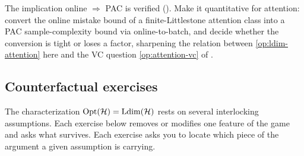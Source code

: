 \begin{openprob}
\label{op:online-to-batch-attention}
The implication online $\Rightarrow$ PAC is verified ().  Make it quantitative for attention: convert the online mistake bound of a finite-Littlestone attention class into a PAC sample-complexity bound via online-to-batch, and decide whether the conversion is tight or loses a factor, sharpening the relation between \cref{op:ldim-attention} here and the VC question \cref{op:attention-vc} of .
\end{openprob}


\subsection*{Counterfactual exercises}

The characterization $\mathrm{Opt}(\mathcal{H})=\mathrm{Ldim}(\mathcal{H})$ rests on several interlocking assumptions. Each exercise below removes or modifies one feature of the game and asks what survives. Each exercise asks you to locate which piece of the argument a given assumption is carrying.


